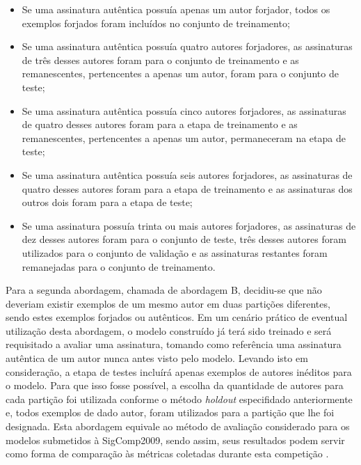 
\begin{itemize}
	\item Se uma assinatura autêntica possuía apenas um autor forjador, todos os exemplos forjados foram incluídos no conjunto de treinamento;
	\item Se uma assinatura autêntica possuía quatro autores forjadores, as assinaturas de três desses autores foram para o conjunto de treinamento e as remanescentes, pertencentes a apenas um autor, foram para o conjunto de teste;
	\item Se uma assinatura autêntica possuía cinco autores forjadores, as assinaturas de quatro desses autores foram para a etapa de treinamento e as remanescentes, pertencentes a apenas um autor, permaneceram na etapa de teste;
	\item Se uma assinatura autêntica possuía seis autores forjadores, as assinaturas de quatro desses autores foram para a etapa de treinamento e as assinaturas dos outros dois foram para a etapa de teste;
	\item Se uma assinatura possuía trinta ou mais autores forjadores, as assinaturas de dez desses autores foram para o conjunto de teste, três desses autores foram utilizados para o conjunto de validação e as assinaturas restantes foram remanejadas para o conjunto de treinamento.
\end{itemize}

Para a segunda abordagem, chamada de abordagem B, decidiu-se que não deveriam existir exemplos de um mesmo autor em duas partições diferentes, sendo estes exemplos forjados ou autênticos. Em um cenário prático de eventual utilização desta abordagem, o modelo construído já terá sido treinado e será requisitado a avaliar uma assinatura, tomando como referência uma assinatura autêntica de um autor nunca antes visto pelo modelo. Levando isto em consideração, a etapa de testes incluírá apenas exemplos de autores inéditos para o modelo. Para que isso fosse possível, a escolha da quantidade de autores para cada partição foi utilizada conforme o método \emph{holdout} especifidado anteriormente e, todos exemplos de dado autor, foram utilizados para a partição que lhe foi designada. Esta abordagem equivale ao método de avaliação considerado para os modelos submetidos à SigComp2009, sendo assim, seus resultados podem servir como forma de comparação às métricas coletadas durante esta competição \cite{icdar2009}.

